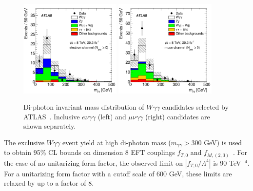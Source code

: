 \begin{figure}[p]
    \centering
    \includegraphics[width=0.45\textwidth]{figures/ss-inclboson-triboson-wgg-ele-atlas8tev.pdf}
    \includegraphics[width=0.45\textwidth]{figures/ss-inclboson-triboson-wgg-mu-atlas8tev.pdf}
    \caption{Di-photon invariant mass distribution of $W\gamma\gamma$ candidates selected by ATLAS~\cite{Aad:2015uqa}.  Inclusive $e\nu\gamma\gamma$ (left) and $\mu\nu\gamma\gamma$ (right) candidates are shown separately.}
    \label{fig:ss-inclboson-triboson-wgg-atlas8tev}
\end{figure}

The exclusive $W\gamma\gamma$ event yield at high di-photon mass
($m_{\gamma\gamma} > 300$ GeV) is used to obtain 95\% CL bounds on
dimension 8 EFT couplings $f_{T,0}$ and
$f_{M,(2,3)}$~\cite{Eboli:2006wa}.  For the case of no unitarizing
form factor, the observed limit on $|f_{T,0}/\Lambda^4|$ is 90
TeV$^{-4}$.  For a unitarizing form factor with a cutoff scale of 600
GeV, these limits are relaxed by up to a factor of 8.

